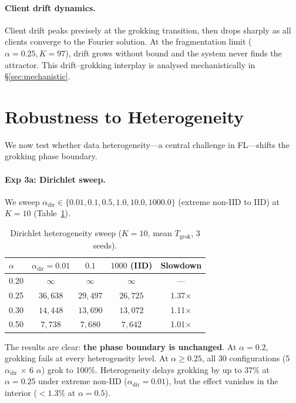 \documentclass{article}
\begin{document}
\paragraph{Client drift dynamics.}
Client drift peaks precisely at the grokking transition, then drops sharply as all clients converge to the Fourier solution.
At the fragmentation limit ($\alpha{=}0.25, K{=}97$), drift grows without bound and the system never finds the attractor.
This drift--grokking interplay is analysed mechanistically in \S\ref{sec:mechanistic}.


\section{Robustness to Heterogeneity}
\label{sec:heterogeneity}

We now test whether data heterogeneity---a central challenge in FL---shifts the grokking phase boundary.

\paragraph{Exp 3a: Dirichlet sweep.}
We sweep $\alpha_{\mathrm{dir}} \in \{0.01, 0.1, 0.5, 1.0, 10.0, 1000.0\}$ (extreme non-IID to IID) at $K = 10$ (Table~\ref{tab:exp3a}).

\begin{table}[t]
\centering
\small
\caption{Dirichlet heterogeneity sweep ($K{=}10$, mean $T_{\mathrm{grok}}$, 3 seeds).}
\label{tab:exp3a}
\begin{tabular}{lcccc}
\toprule
$\alpha$ & $\alpha_{\mathrm{dir}}{=}0.01$ & $0.1$ & $1000$ (IID) & Slowdown \\
\midrule
0.20 & $\infty$ & $\infty$ & $\infty$ & --- \\
0.25 & $36{,}638$ & $29{,}497$ & $26{,}725$ & 1.37$\times$ \\
0.30 & $14{,}448$ & $13{,}690$ & $13{,}072$ & 1.11$\times$ \\
0.50 & $7{,}738$ & $7{,}680$ & $7{,}642$ & 1.01$\times$ \\
\bottomrule
\end{tabular}
\end{table}

The results are clear: \textbf{the phase boundary is unchanged}.
At $\alpha = 0.2$, grokking fails at every heterogeneity level.
At $\alpha \geq 0.25$, all 30 configurations (5 $\alpha_{\mathrm{dir}}$ $\times$ 6 $\alpha$) grok to 100\%.
Heterogeneity delays grokking by up to 37\% at $\alpha = 0.25$ under extreme non-IID ($\alpha_{\mathrm{dir}} = 0.01$), but the effect vanishes in the interior ($<1.3\%$ at $\alpha = 0.5$).
\end{document}
